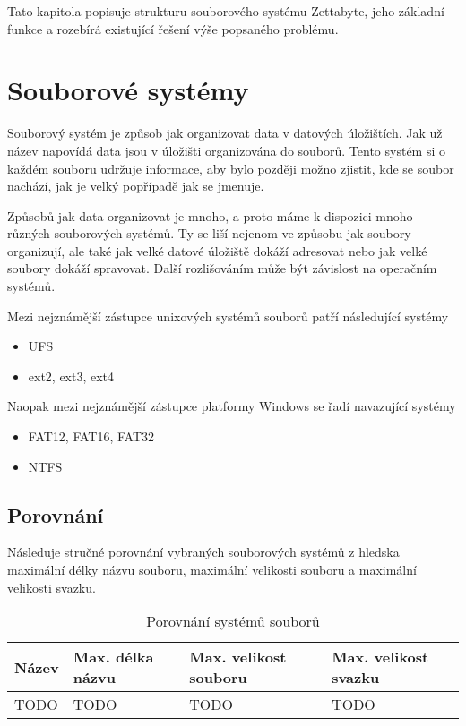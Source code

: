 Tato kapitola popisuje strukturu souborového systému Zettabyte, jeho základní funkce a rozebírá existující řešení výše popsaného problému.
\section{Souborové systémy}
    Souborový systém je způsob jak organizovat data v datových úložištích. Jak už název napovídá data jsou v úložišti organizována do souborů.
    Tento systém si o každém souboru udržuje informace, aby bylo později možno zjistit, kde se soubor nachází, jak je velký popřípadě jak se jmenuje.

    Způsobů jak data organizovat je mnoho, a proto máme k dispozici mnoho různých souborových systémů. Ty se liší nejenom ve způsobu jak soubory organizují,
    ale také jak velké datové úložiště dokáží adresovat nebo jak velké soubory dokáží spravovat. Další rozlišováním může být závislost na operačním systémů.

    Mezi nejznámější zástupce unixových systémů souborů patří následující systémy
    \begin{itemize}
      \item UFS
      \item ext2, ext3, ext4
    \end{itemize}

    Naopak mezi nejznámější zástupce platformy Windows se řadí navazující systémy
    \begin{itemize}
      \item FAT12, FAT16, FAT32
      \item NTFS
    \end{itemize}

        \subsection{Porovnání}
        Následuje stručné porovnání vybraných souborových systémů z hledska maximální délky názvu souboru, maximální velikosti souboru a maximální velikosti svazku.
        \begin{table}[]
        \centering
        \caption{Porovnání systémů souborů}
        \label{fscompare}
        \begin{tabular}{|l|l|l|l|}
        \hline
        Název & Max. délka názvu & Max. velikost souboru & Max. velikost svazku \\ \hline
        TODO & TODO & TODO & TODO \\ \hline
        \end{tabular}
        \end{table}
